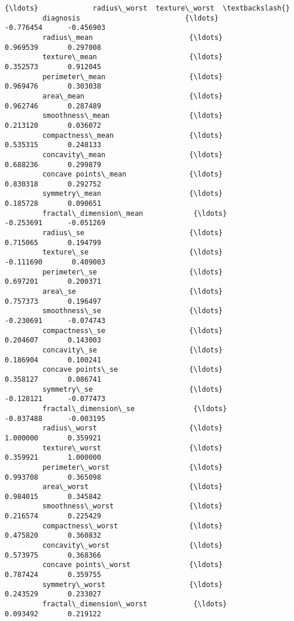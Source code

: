 \documentclass[11pt]{article}
\begin{document}
\begin{Verbatim}[commandchars=\\\{\}]
                                           {\ldots}             radius\_worst  texture\_worst  \textbackslash{}
         diagnosis                         {\ldots}                -0.776454      -0.456903   
         radius\_mean                       {\ldots}                 0.969539       0.297008   
         texture\_mean                      {\ldots}                 0.352573       0.912045   
         perimeter\_mean                    {\ldots}                 0.969476       0.303038   
         area\_mean                         {\ldots}                 0.962746       0.287489   
         smoothness\_mean                   {\ldots}                 0.213120       0.036072   
         compactness\_mean                  {\ldots}                 0.535315       0.248133   
         concavity\_mean                    {\ldots}                 0.688236       0.299879   
         concave points\_mean               {\ldots}                 0.830318       0.292752   
         symmetry\_mean                     {\ldots}                 0.185728       0.090651   
         fractal\_dimension\_mean            {\ldots}                -0.253691      -0.051269   
         radius\_se                         {\ldots}                 0.715065       0.194799   
         texture\_se                        {\ldots}                -0.111690       0.409003   
         perimeter\_se                      {\ldots}                 0.697201       0.200371   
         area\_se                           {\ldots}                 0.757373       0.196497   
         smoothness\_se                     {\ldots}                -0.230691      -0.074743   
         compactness\_se                    {\ldots}                 0.204607       0.143003   
         concavity\_se                      {\ldots}                 0.186904       0.100241   
         concave points\_se                 {\ldots}                 0.358127       0.086741   
         symmetry\_se                       {\ldots}                -0.128121      -0.077473   
         fractal\_dimension\_se              {\ldots}                -0.037488      -0.003195   
         radius\_worst                      {\ldots}                 1.000000       0.359921   
         texture\_worst                     {\ldots}                 0.359921       1.000000   
         perimeter\_worst                   {\ldots}                 0.993708       0.365098   
         area\_worst                        {\ldots}                 0.984015       0.345842   
         smoothness\_worst                  {\ldots}                 0.216574       0.225429   
         compactness\_worst                 {\ldots}                 0.475820       0.360832   
         concavity\_worst                   {\ldots}                 0.573975       0.368366   
         concave points\_worst              {\ldots}                 0.787424       0.359755   
         symmetry\_worst                    {\ldots}                 0.243529       0.233027   
         fractal\_dimension\_worst           {\ldots}                 0.093492       0.219122   
         

\end{Verbatim}
\end{document}

